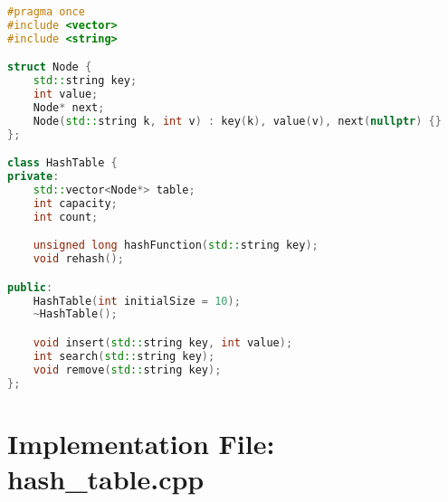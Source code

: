 \documentclass{article}
\begin{document}
\begin{lstlisting}[language=C++]
#pragma once
#include <vector>
#include <string>

struct Node {
    std::string key;
    int value;
    Node* next;
    Node(std::string k, int v) : key(k), value(v), next(nullptr) {}
};

class HashTable {
private:
    std::vector<Node*> table;
    int capacity;
    int count;

    unsigned long hashFunction(std::string key);
    void rehash();

public:
    HashTable(int initialSize = 10);
    ~HashTable();

    void insert(std::string key, int value);
    int search(std::string key);
    void remove(std::string key);
};
\end{lstlisting}

\section*{Implementation File: hash\_table.cpp}
\end{document}
